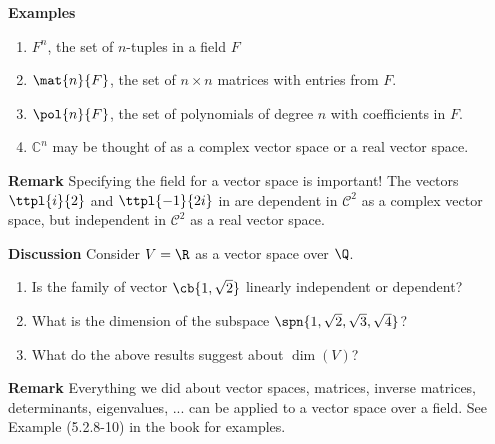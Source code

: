 \documentclass[letterpaper, 10pt]{article}
\begin{document}
\vspace{20pt}

\lb
\textbf{Examples}
\begin{enumerate}
    \item $F^n$, the set of $n$-tuples in a field $F$
    \item $\mat{n}{F}$, the set of $n\times n$ matrices with entries from $F$.
    \item $\pol{n}{F}$, the set of polynomials of degree $n$ with coefficients in $F$.
    \item $\mathbb{C}^n$ may be thought of as a complex vector space or a real vector space.
\end{enumerate}


\vspace{80pt}
\lb
\textbf{Remark}
\lb
Specifying the field for a vector space is important!
The vectors $\ttpl{i}{2}$ and $\ttpl{-1}{2i}$ in are dependent in $\mathcal{C}^2$ as a complex
vector space, but independent in $\mathcal{C}^2$ as a real vector space.

\newpage
\lb
\textbf{Discussion}
\lb
Consider $V = \R$ as a vector space over $\Q$.
\begin{enumerate}
    \item Is the family of vector $ \cb{1, \sqrt{2}}$ linearly independent or dependent?
    \item What is the dimension of the subspace $\spn{1, \sqrt{2}, \sqrt{3}, \sqrt{4}}$?
    \item What do the above results suggest about $\dim(V)$?
\end{enumerate}

\vspace{200pt}
\lb
\textbf{Remark}
\lb
Everything we did about vector spaces, matrices, inverse matrices, determinants, eigenvalues, ...
can be applied to a vector space over a field. See Example (5.2.8-10) in the book for examples.
\end{document}
